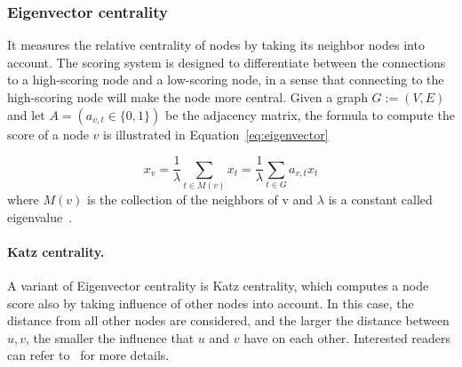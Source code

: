 
\subsubsection{Eigenvector centrality}
%
It measures the relative centrality of nodes by taking its neighbor nodes into
account. The scoring system is designed to differentiate between the
connections to a high-scoring node and a low-scoring node, in a sense that
connecting to the high-scoring node will make the node more central. Given a
graph $G:=(V,E)$ and let $A = (a_{v,t}\in\{0, 1\})$ be the adjacency matrix,
the formula to compute the score of a node $v$ is illustrated in
Equation~\eqref{eq:eigenvector}

\begin{equation}
	\label{eq:eigenvector}
	x_v = \frac{1}{\lambda} \sum_{t \in M(v)}x_t = \frac{1}{\lambda} \sum_{t \in G} a_{v,t}x_t
\end{equation}
where $M(v)$ is the collection of the neighbors of v and $\lambda$ is a
constant called eigenvalue~\cite{Eigenvecto-wiki}.

\paragraph{Katz centrality.}   A variant of Eigenvector centrality is Katz
centrality, which computes a node score also by taking influence of other
nodes into account. In this case, the distance from all other nodes are
considered, and the larger the distance between $u, v$, the smaller the
influence that $u$ and $v$ have on each other. Interested readers can refer 
to~\cite{katz-wiki} for more details.

